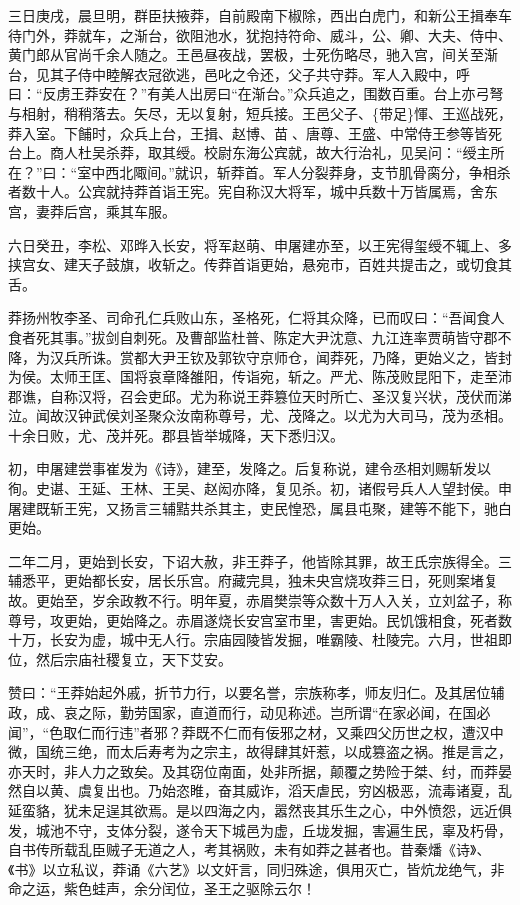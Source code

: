 \documentclass[]{article}
\begin{document}
三日庚戌，晨旦明，群臣扶掖莽，自前殿南下椒除，西出白虎门，和新公王揖奉车待门外，莽就车，之渐台，欲阻池水，犹抱持符命、威斗，公、卿、大夫、侍中、黄门郎从官尚千余人随之。王邑昼夜战，罢极，士死伤略尽，驰入宫，间关至渐台，见其子侍中睦解衣冠欲逃，邑叱之令还，父子共守莽。军人入殿中，呼曰：``反虏王莽安在？''有美人出房曰``在渐台。''众兵追之，围数百重。台上亦弓弩与相射，稍稍落去。矢尽，无以复射，短兵接。王邑父子、\{带足\}惲、王巡战死，莽入室。下餔时，众兵上台，王揖、赵博、苗、唐尊、王盛、中常侍王参等皆死台上。商人杜吴杀莽，取其绶。校尉东海公宾就，故大行治礼，见吴问：``绶主所在？''曰：``室中西北陬间。''就识，斩莽首。军人分裂莽身，支节肌骨脔分，争相杀者数十人。公宾就持莽首诣王宪。宪自称汉大将军，城中兵数十万皆属焉，舍东宫，妻莽后宫，乘其车服。

六日癸丑，李松、邓晔入长安，将军赵萌、申屠建亦至，以王宪得玺绶不辄上、多挟宫女、建天子鼓旗，收斩之。传莽首诣更始，悬宛市，百姓共提击之，或切食其舌。

莽扬州牧李圣、司命孔仁兵败山东，圣格死，仁将其众降，已而叹曰：``吾闻食人食者死其事。''拔剑自刺死。及曹部监杜普、陈定大尹沈意、九江连率贾萌皆守郡不降，为汉兵所诛。赏都大尹王钦及郭钦守京师仓，闻莽死，乃降，更始义之，皆封为侯。太师王匡、国将哀章降雒阳，传诣宛，斩之。严尤、陈茂败昆阳下，走至沛郡谯，自称汉将，召会吏邱。尤为称说王莽篡位天时所亡、圣汉复兴状，茂伏而涕泣。闻故汉钟武侯刘圣聚众汝南称尊号，尤、茂降之。以尤为大司马，茂为丞相。十余日败，尤、茂并死。郡县皆举城降，天下悉归汉。

初，申屠建尝事崔发为《诗》，建至，发降之。后复称说，建令丞相刘赐斩发以徇。史谌、王延、王林、王吴、赵闳亦降，复见杀。初，诸假号兵人人望封侯。申屠建既斩王宪，又扬言三辅黠共杀其主，吏民惶恐，属县屯聚，建等不能下，驰白更始。

二年二月，更始到长安，下诏大赦，非王莽子，他皆除其罪，故王氏宗族得全。三辅悉平，更始都长安，居长乐宫。府藏完具，独未央宫烧攻莽三日，死则案堵复故。更始至，岁余政教不行。明年夏，赤眉樊崇等众数十万人入关，立刘盆子，称尊号，攻更始，更始降之。赤眉遂烧长安宫室市里，害更始。民饥饿相食，死者数十万，长安为虚，城中无人行。宗庙园陵皆发掘，唯霸陵、杜陵完。六月，世祖即位，然后宗庙社稷复立，天下艾安。

赞曰：``王莽始起外戚，折节力行，以要名誉，宗族称孝，师友归仁。及其居位辅政，成、哀之际，勤劳国家，直道而行，动见称述。岂所谓``在家必闻，在国必闻''，``色取仁而行违''者邪？莽既不仁而有佞邪之材，又乘四父历世之权，遭汉中微，国统三绝，而太后寿考为之宗主，故得肆其奸惹，以成篡盗之祸。推是言之，亦天时，非人力之致矣。及其窃位南面，处非所据，颠覆之势险于桀、纣，而莽晏然自以黄、虞复出也。乃始恣睢，奋其威诈，滔天虐民，穷凶极恶，流毒诸夏，乱延蛮貉，犹未足逞其欲焉。是以四海之内，嚣然丧其乐生之心，中外愤怨，远近俱发，城池不守，支体分裂，遂令天下城邑为虚，丘垅发掘，害遍生民，辜及朽骨，自书传所载乱臣贼子无道之人，考其祸败，未有如莽之甚者也。昔秦燔《诗》、《书》以立私议，莽诵《六艺》以文奸言，同归殊途，俱用灭亡，皆炕龙绝气，非命之运，紫色蛙声，余分闰位，圣王之驱除云尔！
\end{document}
